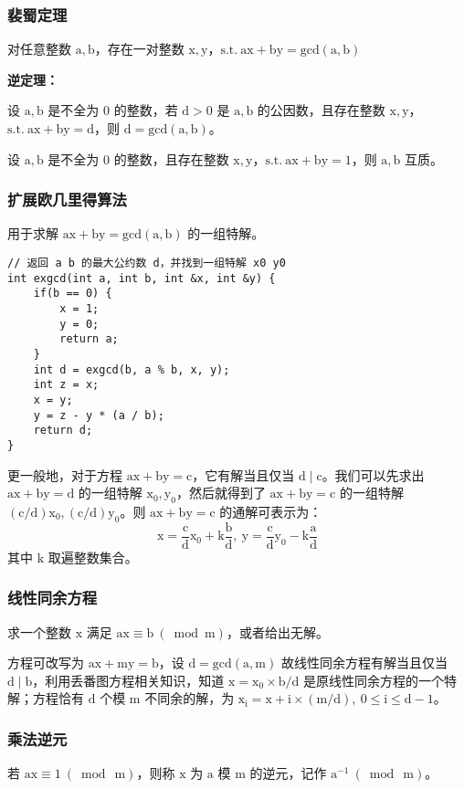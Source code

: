 \documentclass[UTF8]{article}
\begin{document}
\subsubsection{裴蜀定理}
对任意整数 $\mathrm{a,b}$，存在一对整数 $\mathrm{x,y}$，$\mathrm{s.t. \ ax + by = gcd(a,b)}$ 

\noindent \textbf{逆定理：}

设 $\mathrm{a,b}$ 是不全为 $\mathrm{0}$ 的整数，若 $\mathrm{d > 0}$ 是 $\mathrm{a,b}$ 的公因数，且存在整数 $\mathrm{x,y}$，$\mathrm{s.t. \ ax + by = d}$，则 $\mathrm{d = gcd(a,b)}$。

设 $\mathrm{a,b}$ 是不全为 $\mathrm{0}$ 的整数，且存在整数 $\mathrm{x,y}$，$\mathrm{s.t. \ ax + by = 1}$，则 $\mathrm{a,b}$ 互质。


\subsubsection{扩展欧几里得算法}
用于求解 $\mathrm{ax + by = gcd(a,b)}$ 的一组特解。
\begin{lstlisting}[caption=扩展欧几里得算法]
// 返回 a b 的最大公约数 d，并找到一组特解 x0 y0
int exgcd(int a, int b, int &x, int &y) {
	if(b == 0) {
		x = 1;
		y = 0;
		return a;
	}
	int d = exgcd(b, a % b, x, y);
	int z = x;
	x = y;
	y = z - y * (a / b);
	return d;
}
\end{lstlisting}
更一般地，对于方程 $\mathrm{ax + by = c}$，它有解当且仅当 $\mathrm{d \mid c}$。我们可以先求出 $\mathrm{ax + by = d}$ 的一组特解 $\mathrm{x_0, y_0}$，然后就得到了 $\mathrm{ax + by = c}$ 的一组特解 $\mathrm{(c/d)x_0, (c/d)y_0}$。则 $\mathrm{ax + by = c}$ 的通解可表示为：
$$
\mathrm{x = \frac{c}{d}x_0 + k\frac{b}{d},\ y = \frac{c}{d}y_0 - k\frac{a}{d}}
$$
其中 $\mathrm{k}$ 取遍整数集合。


\subsubsection{线性同余方程}
求一个整数 $\mathrm{x}$ 满足 $\mathrm{ax \equiv b\ (\bmod m) }$，或者给出无解。

方程可改写为 $\mathrm{ax + my = b}$，设 $\mathrm{d = gcd(a,m)}$ 故线性同余方程有解当且仅当 $\mathrm{d \mid b}$，利用丢番图方程相关知识，知道 $\mathrm{x = x_0 \times b / d}$ 是原线性同余方程的一个特解；方程恰有 $\mathrm{d}$ 个模 $\mathrm{m}$ 不同余的解，为 $\mathrm{x_i = x + i \times (m/d), \ 0 \le i \le d - 1}$。


\subsubsection{乘法逆元}
若 $\mathrm{ax \equiv 1 \ (\bmod\  m)}$，则称 $\mathrm{x}$ 为 $\mathrm{a}$ 模 $\mathrm{m}$ 的逆元，记作 $\mathrm{a^{-1}\  (\bmod \ m)}$。
\end{document}
